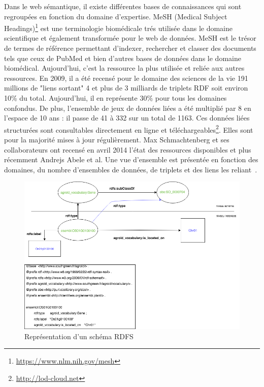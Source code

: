 Dans le web sémantique, il existe différentes bases de connaissances qui sont regroupées en fonction du domaine d'expertise. MeSH (Medical Subject Headings)\footnote{\url{https://www.nlm.nih.gov/mesh}} est une terminologie biomédicale trés utilisée dans le domaine scientifique et également transformée pour le web de données. MeSH est le trésor de termes de référence permettant d’indexer, rechercher et classer des documents tels que ceux de PubMed et bien d'autres bases de données dans le domaine biomédical. Aujourd'hui, c'est la ressource la plus utilisée et reliée aux autres ressources. En 2009, il a été recensé pour le domaine des sciences de la vie 191 millions de "liens sortant" 4 et plus de 3 milliards de triplets RDF soit environ 10\% du total. Aujourd'hui, il en représente 30\% pour tous les domaines confondus. De plus, l’ensemble de jeux de données liées a été multiplié par 8 en l'espace de 10 ans : il passe de 41 à 332 sur un total de 1163. Ces données liées structurées sont consultables directement en ligne et téléchargeables\footnote{\url{http://lod-cloud.net}}. Elles sont pour la majorité mises à jour régulièrement. Max Schmachtenberg et ses collaborateurs ont recensé en avril 2014 l'état des ressources disponibles et plus récemment Andrejs Abele et al. Une vue d’ensemble est présentée en fonction des domaines, du nombre d’ensembles de données, de triplets et des liens les reliant~\cite{Schmachtenberg-al2014}.\\

\begin{figure}[!vt]
\begin{center}
	\includegraphics[width=1\textwidth]{Figures/RDF-into.png}
\end{center}
\caption{\label{RDFS} Représentation d'un schéma RDFS }
\end{figure}



